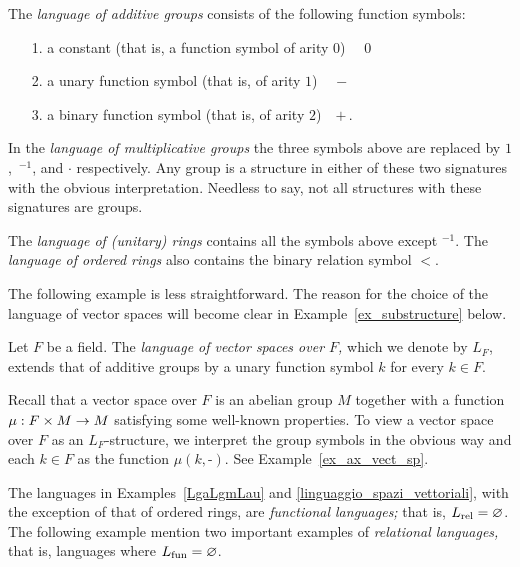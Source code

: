 \begin{example}\label{LgaLgmLau}
The \emph{language of additive groups\/} consists of the following function symbols:\nobreak
\begin{itemize}
\item[1.] a constant (that is, a function symbol of arity $0$) \ \  $0$
\item[2.] a unary function symbol (that is, of arity $1$) \ \   $-$
\item[3.] a binary function symbol (that is, of arity $2$)\ \  $+ \,$.
\end{itemize}
In the \emph{language of multiplicative groups\/} the three symbols above are replaced by $1$,~${}^{-1}$, and $\cdot$ respectively. Any group is a structure in either of these two signatures with the obvious interpretation. Needless to say, not all structures with these signatures are groups.

The \emph{language of (unitary) rings\/} contains all the symbols above except ${}^{-1}$.
The  \emph{language of ordered rings\/} also contains the binary relation symbol $<$.
\end{example}

The following example is less straightforward. The reason for the choice of the language of vector spaces will become clear in Example~\ref{ex_substructure} below.

\begin{example}\label{linguaggio_spazi_vettoriali}
Let $F$ be a field. The \emph{language of vector spaces over $F$,} which we denote by $L_F$, extends that of additive groups by a unary function symbol $k$ for every $k\in F$.

Recall that a vector space over $F$ is an abelian group $M$ together with a function $\mu:F\times M\rightarrow M$ satisfying some well-known properties.
To view a vector space over $F$ as an $L_F$-structure, we interpret the group symbols in the obvious way and each $k\in F$ as the function $\mu(k,\mbox{-})$.
See Example~\ref{ex_ax_vect_sp}.
\end{example}

The languages in Examples~\ref{LgaLgmLau} and \ref{linguaggio_spazi_vettoriali}, with the exception of that of ordered rings, are \emph{functional languages;} that is, $L_{\rm rel}=\varnothing$. The following example mention two important examples of \emph{relational languages,} that is, languages where $L_{\rm fun}=\varnothing$.

